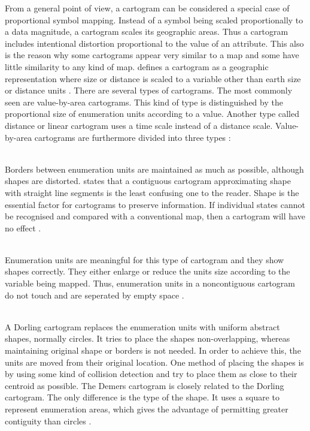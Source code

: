 From a general point of view, a cartogram can be considered a special case of proportional symbol mapping. Instead of a symbol being scaled proportionally to a data magnitude, a cartogram scales its geographic areas. Thus a cartogram includes intentional distortion proportional to the value of an attribute. This also is the reason why some cartograms appear very similar to a map and some have little similarity to any kind of map. \citeauthor{Tyner2010} defines a cartogram as a geographic representation where size or distance is scaled to a variable other than earth size or distance units .
There are several types of cartograms. The most commonly seen are value-by-area cartograms. This kind of type is distinguished by the proportional size of enumeration units according to a value. Another type called distance or linear cartogram uses a time scale instead of a distance scale. Value-by-area cartograms are furthermore divided into three types :

\begin{enumerate}

 \hfill \\
Borders between enumeration units are maintained as much as possible, although shapes are distorted. \citeauthor{Tyner2010} states that a contiguous cartogram approximating shape with straight line segments is the least confusing one to the reader. Shape is the essential factor for cartograms to preserve information. If individual states cannot be recognised and compared with a conventional map, then a cartogram will have no effect .

 \hfill \\
Enumeration units are meaningful for this type of cartogram and they show shapes correctly. They either enlarge or reduce the units size according to the variable being mapped. Thus, enumeration units in a noncontiguous cartogram do not touch and are seperated by empty space .

 \hfill \\
A Dorling cartogram replaces the enumeration units with uniform abstract shapes, normally circles. It tries to place the shapes non-overlapping, whereas maintaining original shape or borders is not needed. In order to achieve this, the units are moved from their original location. One method of placing the shapes is by using some kind of collision detection and try to place them as close to their centroid as possible. The Demers cartogram is closely related to the Dorling cartogram. The only difference is the type of the shape. It uses a square to represent enumeration areas, which gives the advantage of permitting greater contiguity than circles .

\end{enumerate}

